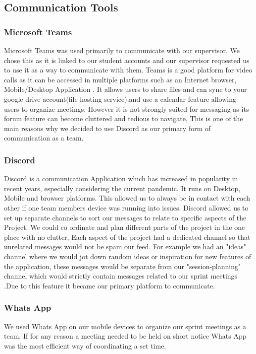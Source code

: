 \subsection{Communication Tools}
\subsubsection{Microsoft Teams}
Microsoft Teams was used primarily to communicate with our supervisor. We chose this as it is linked to our student accounts and our supervisor requested us to use it as a way to communicate with them. Teams is a good platform for video calls as it can be accessed in multiple platforms such as an Internet browser, Mobile/Desktop Application . It allows users to share files and can sync to your google drive account(file hosting service).and use a calendar feature allowing users to organize meetings.
\newline
However it is not strongly suited for messaging as its forum feature can become cluttered and tedious to navigate,
This is one of the main reasons why we decided to use Discord as our primary form of communication as a team.
\subsubsection{Discord} Discord is a communication Application which has increased in popularity in recent years, especially considering the current pandemic. It runs on Desktop, Mobile and browser platforms. This allowed us to always be in contact with each other if one team members device was running into issues.  
\newline
Discord allowed us to set up separate channels to sort our messages to relate to specific aspects of the Project. We could co ordinate and plan different parts of the project in the one place with no clutter, Each aspect of the project had a dedicated channel so that unrelated messages would not be spam our feed. For example we had an "ideas" channel where we would jot down random ideas or inspiration for new features of the application, these messages would be separate from our "session-planning" channel which would strictly contain messages related to our sprint meetings .Due to this feature it became our primary platform to communicate.
\newline 
\subsubsection{Whats App}
We used Whats App on our mobile devices to organize our sprint meetings as a team. If for any reason a meeting needed to be held on short notice Whats App was the most efficient way of coordinating a set time.

